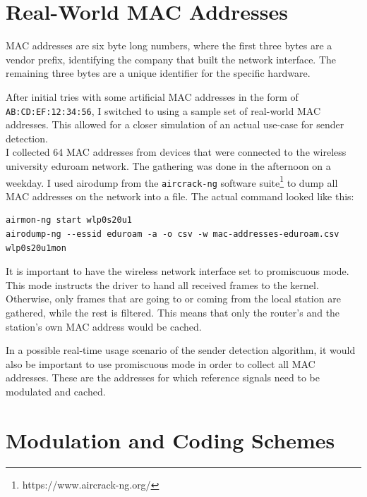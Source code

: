 
\section{Real-World MAC Addresses}\label{sec:real-world-macs}

\gls{MAC} addresses are six byte long numbers, where the first three bytes are a vendor prefix, identifying the company that built the network interface. The remaining three bytes are a unique identifier for the specific hardware.

After initial tries with some artificial \gls{MAC} addresses in the form of \texttt{AB:CD:EF:12:34:56}, I switched to using a sample set of real-world \gls{MAC} addresses. This allowed for a closer simulation of an actual use-case for sender detection.\\

I collected 64 \gls{MAC} addresses from devices that were connected to the wireless university eduroam network. The gathering was done in the afternoon on a weekday. I used airodump from the \texttt{aircrack-ng} software suite\footnote{https://www.aircrack-ng.org/} to dump all \gls{MAC} addresses on the network into a file. The actual command looked like this:

\begin{lstlisting}[captionpos=b,caption={Capture Real-World MAC Addresses},label=lst:airodump]
airmon-ng start wlp0s20u1
airodump-ng --essid eduroam -a -o csv -w mac-addresses-eduroam.csv wlp0s20u1mon
\end{lstlisting}

It is important to have the wireless network interface set to promiscuous mode. This mode instructs the driver to hand all received frames to the kernel. Otherwise, only frames that are going to or coming from the local station are gathered, while the rest is filtered. This means that only the router's and the station's own \gls{MAC} address would be cached.

In a possible real-time usage scenario of the sender detection algorithm, it would also be important to use promiscuous mode in order to collect all \gls{MAC} addresses. These are the addresses for which reference signals need to be modulated and cached.



\section{Modulation and Coding Schemes}\label{sec:ex-mcs}

